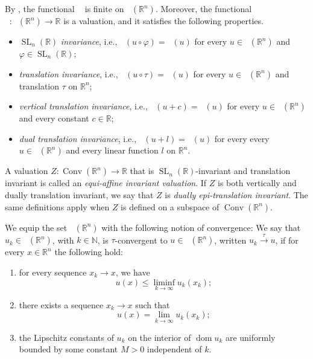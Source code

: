 \documentclass[11pt]{article}
\theoremstyle{definition} %
\DeclareMathOperator{\V}{SL}
\newcommand{\N}{_n(\mathbb{R})}
\newcommand{\RR}{(\mathbb{R}^n)}
\DeclareMathOperator{\Conv}{Conv}
\DeclareMathOperator{\dom}{dom}
\DeclareMathOperator{\LC}{Conv_{ld}}
\DeclareMathOperator{\fas}{\Omega_{func}}
\newcommand{\seq}{\xrightarrow{\tau}}
\begin{document}
By \cite[Theorem~1]{baetaludwigsemicontinuity}, the functional $\fas$ is finite on $\LC(\mathbb{R}^n)$. Moreover, 
the functional $\fas: \LC(\mathbb{R}^n) \to \mathbb{R}$ is a valuation, and it satisfies the following properties.




\begin{itemize}
    \item[(i)]   $\V\N$ \textit{invariance}, i.e., $\fas(u \circ \varphi) = \fas(u)$ for every $u \in \LC\RR$ and $\varphi \in \V\N$;
 
    \item[(ii)]   \textit{translation invariance}, i.e., $\fas(u \circ \tau) = \fas(u)$
    for every $u \in \LC\RR$ and translation $\tau$ on $\mathbb{R}^n$;

    \item[(iii)]  \textit{vertical translation invariance}, i.e., $\fas(u+c) = \fas(u)$ for every $u \in \LC\RR$ and every constant $c \in \mathbb{R}$;
    
    \item[(iv)]  \textit{dual translation invariance}, i.e., $\fas(u+l) = \fas(u)$ for every every $u \in \LC\RR$ and every  linear function $l$ on $\mathbb{R}^n$. 
\end{itemize}
A valuation $Z: \Conv(\mathbb{R}^n)\to \mathbb{R}$ that is $\V\N$-invariant and translation invariant is called an \textit{equi-affine invariant valuation}.  
If $Z$ is both vertically and dually translation invariant, we say that $Z$ is \textit{dually epi-translation invariant}.  
The same definitions apply when $Z$ is defined on a subspace of $\Conv(\mathbb{R}^n)$.


We equip the set $\LC(\mathbb{R}^n)$ with the following notion of convergence: We say that $u_k\in \LC(\mathbb{R}^n)$, with $k\in\mathbb{N}$, is $\tau$-convergent to $u\in \LC(\mathbb{R}^n)$, written $u_k \seq u$, if for every $x\in \mathbb{R}^n$ the following hold:
\begin{enumerate}
\item[(i)] for every sequence $x_k \to x$, we have 
$$u(x)\leq \liminf_{k\rightarrow \infty} u_k(x_k);$$
\item[(ii)] there exists a sequence $x_k \to x$ such that 
$$u(x)= \lim_{k\rightarrow \infty}u_k(x_k);$$
\item[(iii)] the Lipschitz constants of $u_k$ on the interior of $\dom u_k$ are uniformly bounded by some constant $M>0$ independent of $k$.
\end{enumerate}
\end{document}
